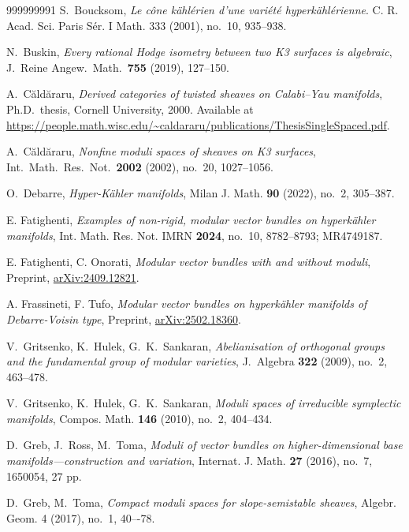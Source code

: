 \documentclass[12pt,a4paper]{amsart}
\theoremstyle{plain}
\theoremstyle{definition}
\theoremstyle{remark}
\begin{document}
\begin{thebibliography}{999999991}
S.~Boucksom,
\textit{Le cône kählérien d'une variété hyperkählérienne}.
C. R. Acad. Sci. Paris Sér. I Math. 333 (2001), no.~10, 935--938.


N.~Buskin,
\textit{Every rational Hodge isometry between two K3 surfaces is algebraic},
J.\ Reine Angew.\ Math.\ \textbf{755} (2019), 127--150.

A.~C\u{a}ld\u{a}raru,
\textit{Derived categories of twisted sheaves on Calabi--Yau manifolds},
Ph.D.\ thesis, Cornell University, 2000.
Available at \url{https://people.math.wisc.edu/~caldararu/publications/ThesisSingleSpaced.pdf}.

A.~C\u{a}ld\u{a}raru,
\textit{Nonfine moduli spaces of sheaves on K3 surfaces},
Int.\ Math.\ Res.\ Not.\ \textbf{2002} (2002), no.~20, 1027--1056.

O.~Debarre, 
\textit{Hyper-Kähler manifolds}, 
Milan J. Math. \textbf{90} (2022), no.~2, 305--387.

 E. Fatighenti, \textit{Examples of non-rigid, modular vector bundles on hyperk\"ahler manifolds}, Int. Math. Res. Not. IMRN {\bf 2024}, no.~10, 8782--8793; MR4749187.

 E. Fatighenti, C. Onorati, \textit{Modular vector bundles with and without moduli}, Preprint, \href{https://arxiv.org/abs/2409.12821}{arXiv:2409.12821}.

 A. Frassineti, F. Tufo, \textit{Modular vector bundles on hyperkähler manifolds of Debarre-Voisin type}, Preprint, \href{https://arxiv.org/abs/2502.18360}{arXiv:2502.18360}.

V.~Gritsenko, K.~Hulek, G.~K.~Sankaran,
\textit{Abelianisation of orthogonal groups and the fundamental group of modular varieties},
J.\ Algebra \textbf{322} (2009), no.~2, 463--478.

V.~Gritsenko, K.~Hulek, G.~K.~Sankaran,
\textit{Moduli spaces of irreducible symplectic manifolds},
Compos. Math. \textbf{146} (2010), no.~2, 404--434.

D.~Greb, J.~Ross, M.~Toma,
\textit{Moduli of vector bundles on higher-dimensional base manifolds---construction and variation},
Internat. J. Math. {\bf 27} (2016), no.~7, 1650054, 27 pp.

D.~Greb, M.~Toma,
\textit{Compact moduli spaces for slope-semistable sheaves},
Algebr. Geom. 4 (2017), no.~1, 40–-78.


\end{thebibliography}
\end{document}
